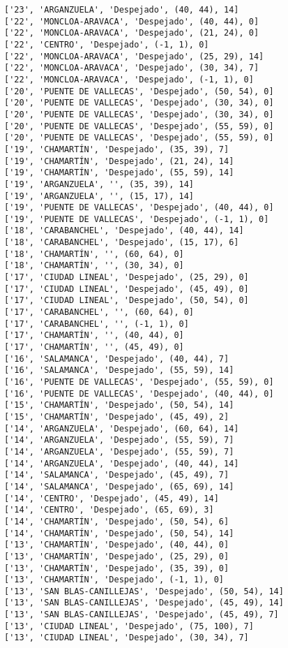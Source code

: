 \documentclass[11pt]{article}
\begin{document}
\begin{Verbatim}[commandchars=\\\{\}]
['23', 'ARGANZUELA', 'Despejado', (40, 44), 14]
['22', 'MONCLOA-ARAVACA', 'Despejado', (40, 44), 0]
['22', 'MONCLOA-ARAVACA', 'Despejado', (21, 24), 0]
['22', 'CENTRO', 'Despejado', (-1, 1), 0]
['22', 'MONCLOA-ARAVACA', 'Despejado', (25, 29), 14]
['22', 'MONCLOA-ARAVACA', 'Despejado', (30, 34), 7]
['22', 'MONCLOA-ARAVACA', 'Despejado', (-1, 1), 0]
['20', 'PUENTE DE VALLECAS', 'Despejado', (50, 54), 0]
['20', 'PUENTE DE VALLECAS', 'Despejado', (30, 34), 0]
['20', 'PUENTE DE VALLECAS', 'Despejado', (30, 34), 0]
['20', 'PUENTE DE VALLECAS', 'Despejado', (55, 59), 0]
['20', 'PUENTE DE VALLECAS', 'Despejado', (55, 59), 0]
['19', 'CHAMARTÍN', 'Despejado', (35, 39), 7]
['19', 'CHAMARTÍN', 'Despejado', (21, 24), 14]
['19', 'CHAMARTÍN', 'Despejado', (55, 59), 14]
['19', 'ARGANZUELA', '', (35, 39), 14]
['19', 'ARGANZUELA', '', (15, 17), 14]
['19', 'PUENTE DE VALLECAS', 'Despejado', (40, 44), 0]
['19', 'PUENTE DE VALLECAS', 'Despejado', (-1, 1), 0]
['18', 'CARABANCHEL', 'Despejado', (40, 44), 14]
['18', 'CARABANCHEL', 'Despejado', (15, 17), 6]
['18', 'CHAMARTÍN', '', (60, 64), 0]
['18', 'CHAMARTÍN', '', (30, 34), 0]
['17', 'CIUDAD LINEAL', 'Despejado', (25, 29), 0]
['17', 'CIUDAD LINEAL', 'Despejado', (45, 49), 0]
['17', 'CIUDAD LINEAL', 'Despejado', (50, 54), 0]
['17', 'CARABANCHEL', '', (60, 64), 0]
['17', 'CARABANCHEL', '', (-1, 1), 0]
['17', 'CHAMARTÍN', '', (40, 44), 0]
['17', 'CHAMARTÍN', '', (45, 49), 0]
['16', 'SALAMANCA', 'Despejado', (40, 44), 7]
['16', 'SALAMANCA', 'Despejado', (55, 59), 14]
['16', 'PUENTE DE VALLECAS', 'Despejado', (55, 59), 0]
['16', 'PUENTE DE VALLECAS', 'Despejado', (40, 44), 0]
['15', 'CHAMARTÍN', 'Despejado', (50, 54), 14]
['15', 'CHAMARTÍN', 'Despejado', (45, 49), 2]
['14', 'ARGANZUELA', 'Despejado', (60, 64), 14]
['14', 'ARGANZUELA', 'Despejado', (55, 59), 7]
['14', 'ARGANZUELA', 'Despejado', (55, 59), 7]
['14', 'ARGANZUELA', 'Despejado', (40, 44), 14]
['14', 'SALAMANCA', 'Despejado', (45, 49), 7]
['14', 'SALAMANCA', 'Despejado', (65, 69), 14]
['14', 'CENTRO', 'Despejado', (45, 49), 14]
['14', 'CENTRO', 'Despejado', (65, 69), 3]
['14', 'CHAMARTÍN', 'Despejado', (50, 54), 6]
['14', 'CHAMARTÍN', 'Despejado', (50, 54), 14]
['13', 'CHAMARTÍN', 'Despejado', (40, 44), 0]
['13', 'CHAMARTÍN', 'Despejado', (25, 29), 0]
['13', 'CHAMARTÍN', 'Despejado', (35, 39), 0]
['13', 'CHAMARTÍN', 'Despejado', (-1, 1), 0]
['13', 'SAN BLAS-CANILLEJAS', 'Despejado', (50, 54), 14]
['13', 'SAN BLAS-CANILLEJAS', 'Despejado', (45, 49), 14]
['13', 'SAN BLAS-CANILLEJAS', 'Despejado', (45, 49), 7]
['13', 'CIUDAD LINEAL', 'Despejado', (75, 100), 7]
['13', 'CIUDAD LINEAL', 'Despejado', (30, 34), 7]

\end{Verbatim}
\end{document}
